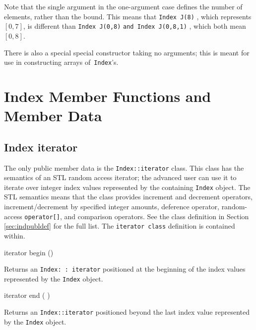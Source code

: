 Note that the single argument in the one-argument case defines the number of elements, rather than the bound. This means that \texttt{Index J(8)} , which represents $[0,7]$, 
is different than \texttt{Index J(0,8)} \texttt{and Index J(0,8,1)} , which both mean $[0,8]$.
 
There is also a special special constructor taking no arguments; this is meant for use in constructing arrays of\texttt{ Index}'s.

\section{Index Member Functions and Member Data}
\subsection{Index iterator} 
The only public member data is the \texttt{Index::iterator} class. This class has the semantics of an STL random access iterator; the advanced user can use 
it to iterate over integer index values represented by the containing \texttt{Index} object. 
The STL semantics means that the class provides increment and decrement operators, increment/decrement by specified integer amounts, deference operator, 
random-access \texttt{operator[]}, and comparison operators. See the class definition in Section \ref{sec:indpubldef} for the full list. The \texttt{iterator class} definition is contained within. 

\begin{smallcode}
iterator begin () 
\end{smallcode}
Returns an \texttt{Index: : iterator} positioned at the beginning of the index values represented by the \texttt{Index} object.
\begin{smallcode}
iterator end ( ) 
\end{smallcode}
Returns an \texttt{Index::iterator} positioned beyond the last index value represented by the \texttt{Index} object. 


